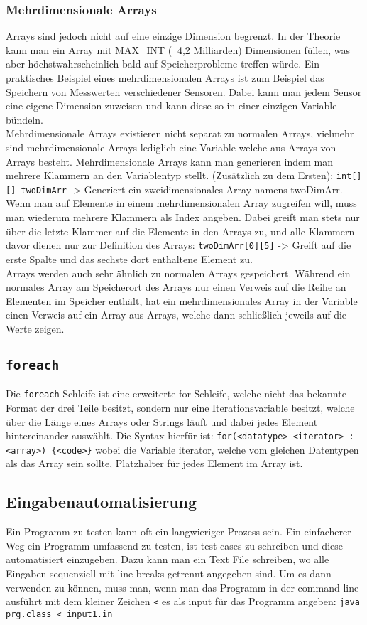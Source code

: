 \documentclass{article}
\begin{document}
	\subsubsection{Mehrdimensionale Arrays}
	Arrays sind jedoch nicht auf eine einzige Dimension begrenzt. In der Theorie kann man ein Array mit MAX\_INT ($~{}$ 4,2 Milliarden) Dimensionen füllen, was aber höchstwahrscheinlich bald auf Speicherprobleme treffen würde. Ein praktisches Beispiel eines mehrdimensionalen Arrays ist zum Beispiel das Speichern von Messwerten verschiedener Sensoren. Dabei kann man jedem Sensor eine eigene Dimension zuweisen und kann diese so in einer einzigen Variable bündeln. \\
	Mehrdimensionale Arrays existieren nicht separat zu normalen Arrays, vielmehr sind mehrdimensionale Arrays lediglich eine Variable welche aus Arrays von Arrays besteht. Mehrdimensionale Arrays kann man generieren indem man mehrere Klammern an den Variablentyp stellt. (Zusätzlich zu dem Ersten): \verb|int[][] twoDimArr| -> Generiert ein zweidimensionales Array namens twoDimArr. Wenn man auf Elemente in einem mehrdimensionalen Array zugreifen will, muss man wiederum mehrere Klammern als Index angeben. Dabei greift man stets nur über die letzte Klammer auf die Elemente in den Arrays zu, und alle Klammern davor dienen nur zur Definition des Arrays: \verb|twoDimArr[0][5]| -> Greift auf die erste Spalte und das sechste dort enthaltene Element zu. \\
	Arrays werden auch sehr ähnlich zu normalen Arrays gespeichert. Während ein normales Array am Speicherort des Arrays nur einen Verweis auf die Reihe an Elementen im Speicher enthält, hat ein mehrdimensionales Array in der Variable einen Verweis auf ein Array aus Arrays, welche dann schließlich jeweils auf die Werte zeigen.  
	\cprotect\subsection{\texorpdfstring{\verb|foreach|}{}}
	Die \verb|foreach| Schleife ist eine erweiterte for Schleife, welche nicht das bekannte Format der drei Teile besitzt, sondern nur eine Iterationsvariable besitzt, welche über die Länge eines Arrays oder Strings läuft und dabei jedes Element hintereinander auswählt. Die Syntax hierfür ist: \verb|for(<datatype> <iterator> : <array>) {<code>}| wobei die Variable iterator, welche vom gleichen Datentypen als das Array sein sollte, Platzhalter für jedes Element im Array ist.
	\subsection{Eingabenautomatisierung}
	Ein Programm zu testen kann oft ein langwieriger Prozess sein. Ein einfacherer Weg ein Programm umfassend zu testen, ist test cases zu schreiben und diese automatisiert einzugeben. Dazu kann man ein Text File schreiben, wo alle Eingaben sequenziell mit line breaks getrennt angegeben sind. Um es dann verwenden zu können, muss man, wenn man das Programm in der command line ausführt mit dem kleiner Zeichen \verb|<| es als input für das Programm angeben: \verb|java prg.class < input1.in| 
\end{document}
